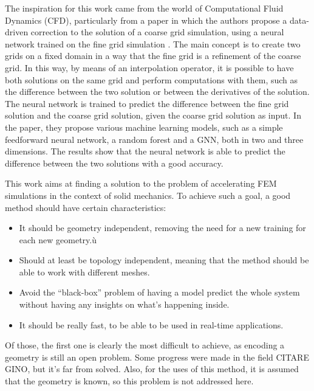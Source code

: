 The inspiration for this work came from the world of Computational Fluid Dynamics (CFD), particularly from a paper in which the authors propose a data-driven correction to the solution of a coarse grid simulation, using a neural network trained on the fine grid simulation \cite{kienerDatadrivenCorrectionCoarse2023}. The main concept is to create two grids on a fixed domain in a way that the fine grid is a refinement of the coarse grid. In this way, by means of an interpolation operator, it is possible to have both solutions on the same grid and perform computations with them, such as the difference between the two solution or between the derivatives of the solution. The neural network is trained to predict the difference between the fine grid solution and the coarse grid solution, given the coarse grid solution as input. In the paper, they propose various machine learning models, such as a simple feedforward neural network, a random forest and a GNN, both in two and three dimensions. The results show that the neural network is able to predict the difference between the two solutions with a good accuracy. 

This work aims at finding a solution to the problem of accelerating FEM simulations in the context of solid mechanics. To achieve such a goal, a good method should have certain characteristics: \begin{itemize}
    \item It should be geometry independent, removing the need for a new training for each new geometry.ù
    \item Should at least be topology independent, meaning that the method should be able to work with different meshes.
    \item Avoid the ``black-box'' problem of having a model predict the whole system without having any insights on what's happening inside.
    \item It should be really fast, to be able to be used in real-time applications.
\end{itemize}
Of those, the first one is clearly the most difficult to achieve, as encoding a geometry is still an open problem. Some progress were made in the field CITARE GINO, but it's far from solved. Also, for the uses of this method, it is assumed that the geometry is known, so this problem is not addressed here. 
